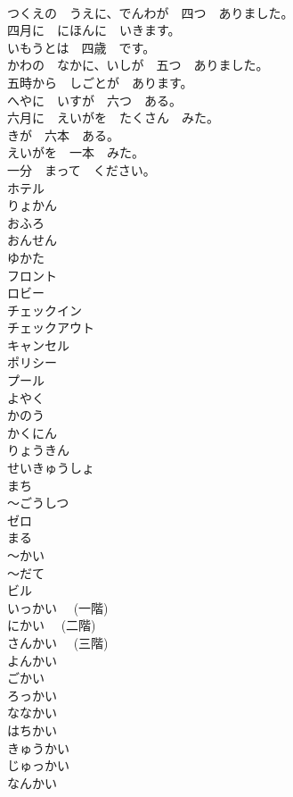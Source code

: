 \documentclass[8pt]{extreport}
\begin{document}
\begin{CJK}{UTF8}{min}
\\	つくえの　うえに、でんわが　四つ　ありました。	
\\	四月に　にほんに　いきます。	
\\	いもうとは　四歳　です。	
\\	かわの　なかに、いしが　五つ　ありました。	
\\	五時から　しごとが　あります。	
\\	へやに　いすが　六つ　ある。	
\\	六月に　えいがを　たくさん　みた。	
\\	きが　六本　ある。	
\\	えいがを　一本　みた。	
\\	一分　まって　ください。	
\\	ホテル	
\\	りょかん	
\\	おふろ	
\\	おんせん	
\\	ゆかた	
\\	フロント	
\\	ロビー	
\\	チェックイン	
\\	チェックアウト	
\\	キャンセル	
\\	ポリシー	
\\	プール	
\\	よやく	
\\	かのう	
\\	かくにん	
\\	りょうきん	
\\	せいきゅうしょ	
\\	まち	
\\	～ごうしつ	
\\	ゼロ	
\\	まる	
\\	～かい	
\\	～だて	
\\	ビル	
\\	いっかい　 (一階)	
\\	にかい　 (二階)	
\\	さんかい　 (三階)	
\\	よんかい	
\\	ごかい	
\\	ろっかい	
\\	ななかい	
\\	はちかい	
\\	きゅうかい	
\\	じゅっかい	
\\	なんかい	

\end{CJK}
\end{document}
